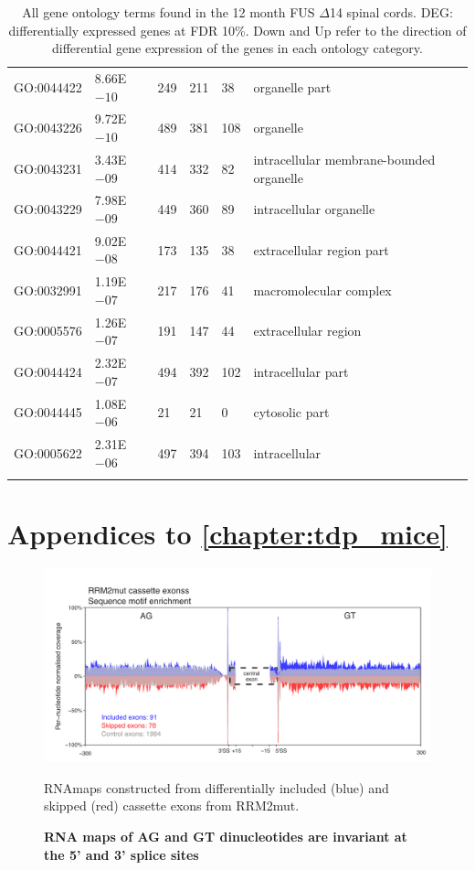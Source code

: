 \begin{appendices}
\begin{longtable}{| p{} | p{} |p{} | p{} |p{} | p{} |}
		GO:0044422 & 8.66E$-10$ & 249 & 211 & 38 & organelle part \\ 
		GO:0043226 & 9.72E$-10$ & 489 & 381 & 108 & organelle \\ 
		GO:0043231 & 3.43E$-09$ & 414 & 332 & 82 & intracellular membrane-bounded organelle \\ 
		GO:0043229 & 7.98E$-09$ & 449 & 360 & 89 & intracellular organelle \\ 
		GO:0044421 & 9.02E$-08$ & 173 & 135 & 38 & extracellular region part \\ 
		GO:0032991 & 1.19E$-07$ & 217 & 176 & 41 & macromolecular complex \\ 
		GO:0005576 & 1.26E$-07$ & 191 & 147 & 44 & extracellular region \\ 
		GO:0044424 & 2.32E$-07$ & 494 & 392 & 102 & intracellular part \\ 
		GO:0044445 & 1.08E$-06$ & 21 & 21 & 0 & cytosolic part \\ 
		GO:0005622 & 2.31E$-06$ & 497 & 394 & 103 & intracellular \\ 
		\hline 
	\caption{All gene ontology terms found in the 12 month FUS $\Delta$14 spinal cords. DEG: differentially expressed genes at FDR 10\%. Down and Up refer to the direction of differential gene expression of the genes in each ontology category.} 
	\label{append:d14_spinal_go} 
\end{longtable} 

\clearpage

\section{Appendices to  \autoref{chapter:tdp_mice} }



\begin{figure}
	\centering
	\includegraphics[width=14cm]{Figures/05_tdp_mice/RNAmap_motif_AG_GT_RRM2mut.png}
	\caption{\textbf{RNA maps of AG and GT dinucleotides are invariant at the 5' and 3' splice sites}}
	RNAmaps constructed from differentially included (blue) and skipped (red) cassette exons from RRM2mut.
	

\end{figure}
\end{appendices}

